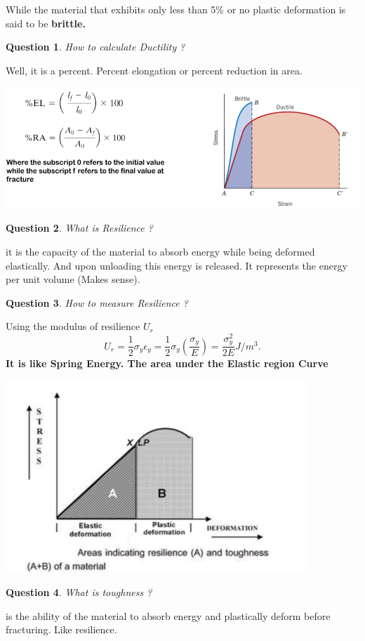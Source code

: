 \documentclass[13]{article}
\newtheorem{exer}{Question}
\begin{document}
While the material that exhibits only less than 5\% or no plastic deformation is said to be \textbf{brittle. } 
\begin{exer}
How to calculate Ductility ?
\end{exer}
Well, it is a percent. Percent elongation or percent reduction in area.
\begin{center}
\includegraphics[scale=0.5]{figures/5.png}
\end{center}
\begin{exer}
What is Resilience ?
\end{exer}
it is the capacity of the material to absorb energy while being deformed elastically. And upon unloading this energy is released. It represents the energy per unit volume (Makes sense).   
\begin{exer}
How to measure Resilience ?
\end{exer}
Using the modulus of resilience $U_r$
\[
	U_r = \frac{1}{2} \sigma_y \epsilon_y = \frac{1}{2} \sigma_y (\frac{\sigma_y}{E}) = \frac{\sigma_y^2}{2E} J/m^3 
.\]
\textbf{It is like Spring Energy. The area under the Elastic region Curve
} 
\begin{center}
\includegraphics[scale=0.5]{figures/6.png}
\end{center}
\begin{exer}
What is toughness ?
\end{exer}
is the ability of the material to absorb energy and plastically deform before fracturing. Like resilience. 
\end{document}
